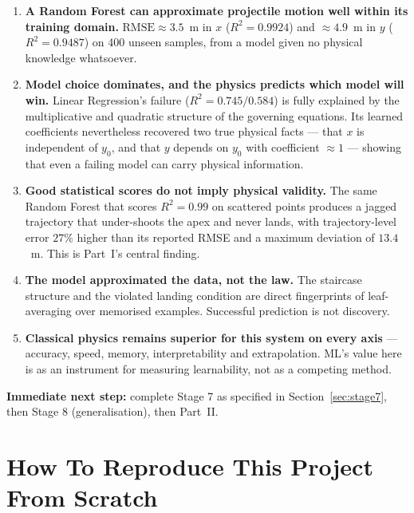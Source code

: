 \documentclass[11pt,a4paper]{article}
\newcommand{\yzero}{y_{0}}
\newcommand{\Rsq}{R^{2}}
\begin{document}
\begin{enumerate}[leftmargin=2em,itemsep=0.3em]
  \item \textbf{A Random Forest can approximate projectile motion well within its training domain.}
        $\mathrm{RMSE}\approx3.5$~m in $x$ ($\Rsq=0.9924$) and ${\approx}4.9$~m in $y$
        ($\Rsq=0.9487$) on 400 unseen samples, from a model given no physical knowledge whatsoever.

  \item \textbf{Model choice dominates, and the physics predicts which model will win.} Linear
        Regression's failure ($\Rsq=0.745/0.584$) is fully explained by the multiplicative and
        quadratic structure of the governing equations. Its learned coefficients nevertheless
        recovered two true physical facts --- that $x$ is independent of $\yzero$, and that $y$
        depends on $\yzero$ with coefficient $\approx1$ --- showing that even a failing model can
        carry physical information.

  \item \textbf{Good statistical scores do not imply physical validity.} The same Random Forest that
        scores $\Rsq=0.99$ on scattered points produces a jagged trajectory that under-shoots the
        apex and never lands, with trajectory-level error $27\%$ higher than its reported RMSE and a
        maximum deviation of $13.4$~m. This is Part~I's central finding.

  \item \textbf{The model approximated the data, not the law.} The staircase structure and the
        violated landing condition are direct fingerprints of leaf-averaging over memorised examples.
        Successful prediction is not discovery.

  \item \textbf{Classical physics remains superior for this system on every axis} --- accuracy,
        speed, memory, interpretability and extrapolation. ML's value here is as an instrument for
        measuring learnability, not as a competing method.
\end{enumerate}

\textbf{Immediate next step:} complete Stage 7 as specified in Section~\ref{sec:stage7}, then Stage 8
(generalisation), then Part~II.

\section{How To Reproduce This Project From Scratch}\label{sec:reproduce}
\end{document}
